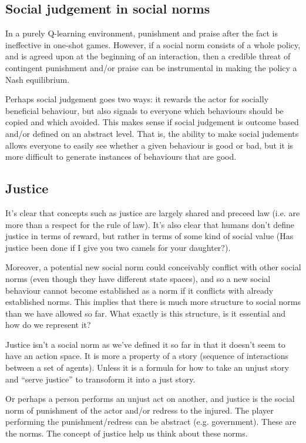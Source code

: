 \documentclass[a4paper]{article}
\begin{document}
\subsection{Social judgement in social norms}

In a purely Q-learning environment, punishment and praise after the fact is ineffective in one-shot games. However, if a social norm consists of a whole policy, and is agreed upon at the beginning of an interaction, then a credible threat of contingent punishment and/or praise can be instrumental in making the policy a Nash equilibrium.

Perhaps social judgement goes two ways: it rewards the actor for socially beneficial behaviour, but also signals to everyone which behaviours should be copied and which avoided. This makes sense if social judgement is outcome based and/or defined on an abstract level. That is, the ability to make social judements allows everyone to easily see whether a given behaviour is good or bad, but it is more difficult to generate instances of behaviours that are good.

\subsection{Justice}

It's clear that concepts such as justice are largely shared and preceed law (i.e. are more than a respect for the rule of law). It's also clear that humans don't define justice in terms of reward, but rather in terms of some kind of social value (Has justice been done if I give you two camels for your daughter?).

Moreover, a potential new social norm could conceivably conflict with other social norms (even though they have different state spaces), and so a new social behaviour cannot become established as a norm if it conflicts with already established norms. This implies that there is much more structure to social norms than we have allowed so far. What exactly is this structure, is it essential and how do we represent it?

Justice isn't a social norm as we've defined it so far in that it doesn't seem to have an action space. It is more a property of a story (sequence of interactions between a set of agents). Unless it is a formula for how to take an unjust story and ``serve justice'' to transoform it into a just story.

Or perhaps a person performs an unjust act on another, and justice is the social norm of punishment of the actor and/or redress to the injured. The player performing the punishment/redress can be abstract (e.g. government). These are the norms. The concept of justice help us think about these norms.
\end{document}
